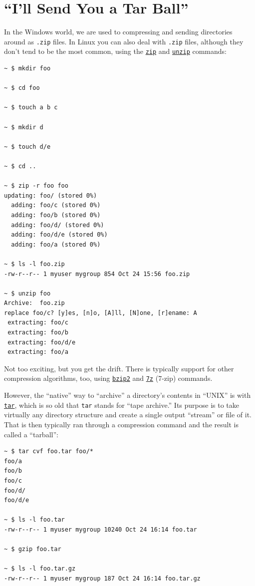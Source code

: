\documentclass[10pt,]{book}
\numberwithin{figure}{chapter}
\begin{document}
\section{``I'll Send You a Tar Ball''}\label{ill-send-you-a-tar-ball}

In the Windows world, we are used to compressing and sending directories
around as \texttt{.zip} files. In Linux you can also deal with
\texttt{.zip} files, although they don't tend to be the most common,
using the \href{http://linux.die.net/man/1/zip}{\texttt{zip}} and
\href{http://linux.die.net/man/1/unzip}{\texttt{unzip}} commands:

\begin{verbatim}
~ $ mkdir foo

~ $ cd foo

~ $ touch a b c

~ $ mkdir d

~ $ touch d/e

~ $ cd ..

~ $ zip -r foo foo
updating: foo/ (stored 0%)
  adding: foo/c (stored 0%)
  adding: foo/b (stored 0%)
  adding: foo/d/ (stored 0%)
  adding: foo/d/e (stored 0%)
  adding: foo/a (stored 0%)

~ $ ls -l foo.zip
-rw-r--r-- 1 myuser mygroup 854 Oct 24 15:56 foo.zip

~ $ unzip foo
Archive:  foo.zip
replace foo/c? [y]es, [n]o, [A]ll, [N]one, [r]ename: A
 extracting: foo/c                   
 extracting: foo/b                   
 extracting: foo/d/e                 
 extracting: foo/a                   
\end{verbatim}

Not too exciting, but you get the drift. There is typically support for
other compression algorithms, too, using
\href{http://linux.die.net/man/1/bzip2}{\texttt{bzip2}} and
\href{http://linux.die.net/man/1/7z}{\texttt{7z}} (7-zip) commands.

However, the ``native'' way to ``archive'' a directory's contents in
``UNIX'' is with \href{http://linux.die.net/man/1/tar}{\texttt{tar}},
which is so old that \texttt{tar} stands for ``tape archive.'' Its
purpose is to take virtually any directory structure and create a single
output ``stream'' or file of it. That is then typically ran through a
compression command and the result is called a ``tarball'':

\begin{verbatim}
~ $ tar cvf foo.tar foo/*
foo/a
foo/b
foo/c
foo/d/
foo/d/e

~ $ ls -l foo.tar
-rw-r--r-- 1 myuser mygroup 10240 Oct 24 16:14 foo.tar

~ $ gzip foo.tar

~ $ ls -l foo.tar.gz 
-rw-r--r-- 1 myuser mygroup 187 Oct 24 16:14 foo.tar.gz
\end{verbatim}
\end{document}
